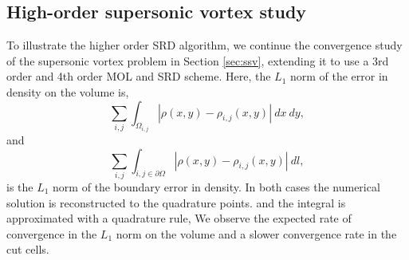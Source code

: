 %

\subsection{High-order supersonic vortex study}

To illustrate the higher order SRD algorithm, we continue the convergence 
study of the supersonic vortex problem in Section \ref{sec:ssv}, 
extending it to use a 3rd order and 4th order MOL and SRD scheme.  Here,
the $L_1$ norm of the error in density on the volume is, 
$$
\sum_{i,j}\int_{\Omega_{i,j}}|\rho(x,y) - \rho_{i,j}(x,y)|~dx~dy,
$$
and
$$
\sum_{i,j}\int_{i,j \in \partial \Omega}|\rho(x,y) - \rho_{i,j}(x,y)|~dl,
$$
is the $L_1$ norm of the boundary error in density.
In both cases the numerical solution is reconstructed to the quadrature points.
and the integral is approximated with a quadrature rule, 
We observe the expected rate of convergence in the $L_1$ norm on the volume and a slower convergence rate in the cut cells.

